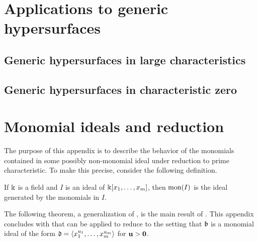 \documentclass[11pt]{amsart}
\begin{document}
\begin{remark}
\end{remark}



\newpage


\section{Applications to generic hypersurfaces}

\subsection{Generic hypersurfaces in large characteristics}

\subsection{Generic hypersurfaces in characteristic zero}


\newpage
\appendix

\section{Monomial ideals and reduction}
\label{monomial-reduction: A}


The purpose of this appendix is to describe the behavior of the monomials contained in some possibly non-monomial ideal under reduction to prime characteristic.  To make this precise, consider the following definition. 

\begin{definition}
If $\Bbbk$ is a field and $I$ is an ideal of $\Bbbk[x_1, \ldots, x_m]$, then $\operatorname{mon}(I)$ is the ideal generated by the monomials in $I$. %
\end{definition}

The following theorem, a generalization of \cite[Lemma 6.1]{budur+mustata+saito.roots_bs_polys_monomial}, is the main result of . This appendix concludes with  that can be applied to reduce  to the setting that $\mathfrak{b}$ is a monomial ideal of the form $\mathfrak{d} = \langle x_1^{u_1}, \ldots, x_m^{u_m} \rangle$ for $\mathbf{u} > \mathbf{0}$.
\end{document}
